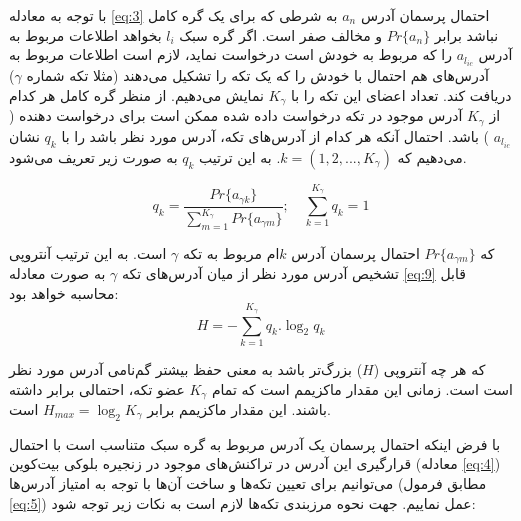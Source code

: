 با توجه به معادله \eqref{eq:3} احتمال پرسمان آدرس $a_n$ به شرطی که برای یک گره کامل نباشد برابر $Pr\{{a_n}\}$ و مخالف صفر است. اگر گره سبک $l_i$ بخواهد اطلاعات مربوط به آدرس $a_{l_{ic}}$ را که مربوط به خودش است درخواست نماید، لازم است اطلاعات مربوط به آدرس‌های هم احتمال با خودش را که یک تکه‌ را تشکیل می‌دهند (مثلا تکه شماره $\gamma$) دریافت کند. تعداد اعضای این تکه را با $K_\gamma$ نمایش می‌دهیم. از منظر گره کامل هر کدام از $K_\gamma$  آدرس‌ موجود در تکه درخواست داده شده ممکن است برای درخواست دهنده ($a_{l_{ic}}$ ) باشد. احتمال آنکه هر کدام از آدرس‌های تکه، آدرس مورد نظر باشد را با $q_k$ نشان می‌دهیم که $k=(1, 2, ..., K_\gamma)$. به این ترتیب $q_k$ به صورت زیر تعریف می‌شود.

\begin{equation}
q_k = \frac{Pr\{a_{\gamma k}\}}{\sum_{m=1}^{K_\gamma}Pr\{a_{\gamma m}\}}; \quad \sum_{k=1}^{K_\gamma} q_k = 1
\label{eq:8}
\end{equation}

که $Pr\{a_{\gamma m}\}$ احتمال پرسمان آدرس $k$ام مربوط به تکه‌ $\gamma$ است. به این ترتیب آنتروپی تشخیص آدرس مورد نظر از میان آدرس‌های تکه $\gamma$ به صورت معادله \eqref{eq:9} قابل محاسبه خواهد بود:
\begin{equation}
H = -\sum_{k=1}^{K_\gamma} q_k . \log_2 q_k
\label{eq:9}
\end{equation}

که هر چه آنتروپی ($H$) بزرگ‌تر باشد به معنی حفظ بیشتر گم‌نامی آدرس مورد نظر است است. زمانی این مقدار ماکزیمم است که تمام $K_\gamma$ عضو تکه، احتمالی برابر داشته باشند. این مقدار ماکزیمم برابر $H_{max} = \log_2K_\gamma$ است.

با فرض اینکه احتمال پرسمان یک آدرس مربوط به گره سبک متناسب است با احتمال قرارگیری این آدرس در تراکنش‌های موجود در زنجیره بلوکی بیت‌کوین (معادله \eqref{eq:4}) می‌توانیم برای تعیین  تکه‌ها و ساخت آن‌ها با توجه به امتیاز آدرس‌ها (مطابق فرمول \eqref{eq:5}) عمل نماییم. جهت نحوه مرزبندی تکه‌ها لازم است به نکات زیر توجه شود:

